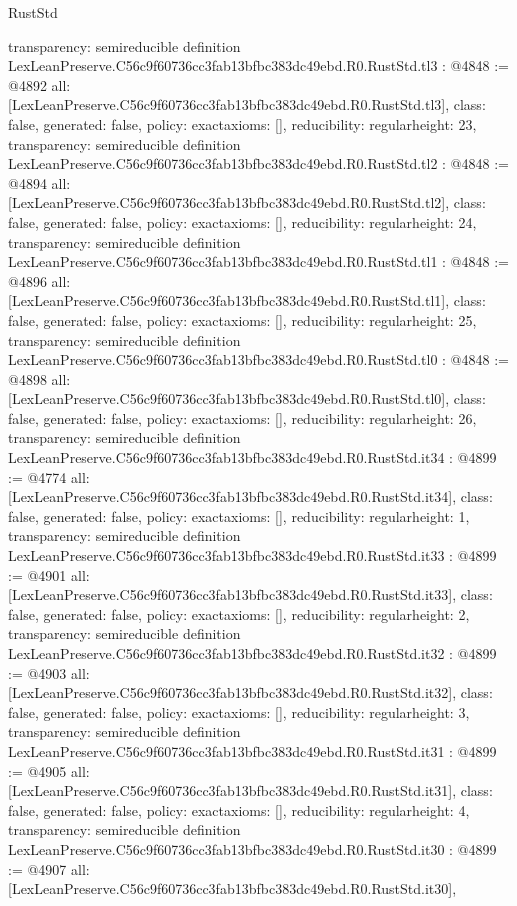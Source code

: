 \begin{lexlean}{RustStd}
\begin{coremodule}
{  transparency: semireducible
}
definition LexLeanPreserve.C56c9f60736cc3fab13bfbc383dc49ebd.R0.RustStd.tl3 : @4848 := @4892 {
  all: [LexLeanPreserve.C56c9f60736cc3fab13bfbc383dc49ebd.R0.RustStd.tl3],
  class: false,
  generated: false,
  policy: exact{axioms: []},
  reducibility: regular{height: 23},
  transparency: semireducible
}
definition LexLeanPreserve.C56c9f60736cc3fab13bfbc383dc49ebd.R0.RustStd.tl2 : @4848 := @4894 {
  all: [LexLeanPreserve.C56c9f60736cc3fab13bfbc383dc49ebd.R0.RustStd.tl2],
  class: false,
  generated: false,
  policy: exact{axioms: []},
  reducibility: regular{height: 24},
  transparency: semireducible
}
definition LexLeanPreserve.C56c9f60736cc3fab13bfbc383dc49ebd.R0.RustStd.tl1 : @4848 := @4896 {
  all: [LexLeanPreserve.C56c9f60736cc3fab13bfbc383dc49ebd.R0.RustStd.tl1],
  class: false,
  generated: false,
  policy: exact{axioms: []},
  reducibility: regular{height: 25},
  transparency: semireducible
}
definition LexLeanPreserve.C56c9f60736cc3fab13bfbc383dc49ebd.R0.RustStd.tl0 : @4848 := @4898 {
  all: [LexLeanPreserve.C56c9f60736cc3fab13bfbc383dc49ebd.R0.RustStd.tl0],
  class: false,
  generated: false,
  policy: exact{axioms: []},
  reducibility: regular{height: 26},
  transparency: semireducible
}
definition LexLeanPreserve.C56c9f60736cc3fab13bfbc383dc49ebd.R0.RustStd.it34 : @4899 := @4774 {
  all: [LexLeanPreserve.C56c9f60736cc3fab13bfbc383dc49ebd.R0.RustStd.it34],
  class: false,
  generated: false,
  policy: exact{axioms: []},
  reducibility: regular{height: 1},
  transparency: semireducible
}
definition LexLeanPreserve.C56c9f60736cc3fab13bfbc383dc49ebd.R0.RustStd.it33 : @4899 := @4901 {
  all: [LexLeanPreserve.C56c9f60736cc3fab13bfbc383dc49ebd.R0.RustStd.it33],
  class: false,
  generated: false,
  policy: exact{axioms: []},
  reducibility: regular{height: 2},
  transparency: semireducible
}
definition LexLeanPreserve.C56c9f60736cc3fab13bfbc383dc49ebd.R0.RustStd.it32 : @4899 := @4903 {
  all: [LexLeanPreserve.C56c9f60736cc3fab13bfbc383dc49ebd.R0.RustStd.it32],
  class: false,
  generated: false,
  policy: exact{axioms: []},
  reducibility: regular{height: 3},
  transparency: semireducible
}
definition LexLeanPreserve.C56c9f60736cc3fab13bfbc383dc49ebd.R0.RustStd.it31 : @4899 := @4905 {
  all: [LexLeanPreserve.C56c9f60736cc3fab13bfbc383dc49ebd.R0.RustStd.it31],
  class: false,
  generated: false,
  policy: exact{axioms: []},
  reducibility: regular{height: 4},
  transparency: semireducible
}
definition LexLeanPreserve.C56c9f60736cc3fab13bfbc383dc49ebd.R0.RustStd.it30 : @4899 := @4907 {
  all: [LexLeanPreserve.C56c9f60736cc3fab13bfbc383dc49ebd.R0.RustStd.it30],
}
\end{coremodule}
\end{lexlean}
